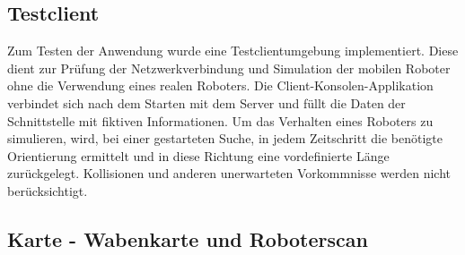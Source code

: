 \subsection{Testclient}\label{serv:testclient}

Zum Testen der Anwendung wurde eine Testclientumgebung implementiert. Diese dient zur Prüfung der Netzwerkverbindung und Simulation der mobilen Roboter ohne die Verwendung eines realen Roboters. Die Client-Konsolen-Applikation verbindet sich nach dem Starten mit dem Server und füllt die Daten der Schnittstelle mit fiktiven Informationen. Um das Verhalten eines Roboters zu simulieren, wird, bei einer gestarteten Suche, in jedem Zeitschritt die benötigte Orientierung ermittelt und in diese Richtung eine vordefinierte Länge zurückgelegt. Kollisionen und anderen unerwarteten Vorkommnisse werden nicht berücksichtigt.

\subsection{Karte - Wabenkarte und Roboterscan}\label{serv:maps}

